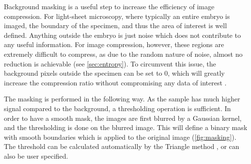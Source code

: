   Background masking is a useful step to increase the efficiency of image compression. For light-sheet microscopy, where typically an entire embryo is imaged, the boundary of the specimen, and thus the area of interest is well defined. Anything outside the embryo is just noise which does not contribute to any useful information. For image compression, however, these regions are extremely difficult to compress, as due to the random nature of noise, almost no reduction is achievable (see \ref{sec:entropy}). To circumvent this issue, the background pixels outside the specimen can be set to 0, which will greatly increase the compression ratio without compromising any data of interest \cite{amat_efficient_2015}.

  The masking is performed in the following way. As the sample has much higher signal compared to the background, a thresholding operation is sufficient. In order to have a smooth mask, the images are first blurred by a Gaussian kernel, and the thresholding is done on the blurred image. This will define a binary mask with smooth boundaries which is applied to the original image (\autoref{fig:masking}). The threshold can be calculated automatically by the Triangle method \cite{zack_automatic_1977}, or can also be user specified.

